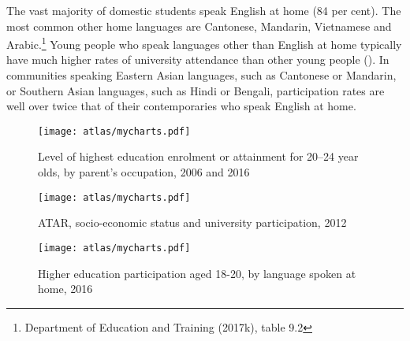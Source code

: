 \documentclass{grattan}
\begin{document}
The vast majority of domestic students speak English at home (84 per cent). The most common other home languages are Cantonese, Mandarin, Vietnamese and Arabic.\footnote{Department of Education and Training (2017k), table 9.2} Young people who speak languages other than English at home typically have much higher rates of university attendance than other young people (). In communities speaking Eastern Asian languages, such as Cantonese or Mandarin, or Southern Asian languages, such as Hindi or Bengali, participation rates are well over twice that of their contemporaries who speak English at home.

    \begin{figure} %
    \caption{Level of highest education enrolment or attainment for 20--24 year olds, by parent's occupation, 2006 and 2016}\label{fig:level-of-highest-education-enrolment-or-attainment-for-2024-year-olds-by-parents-occupation-2006-and-2016}
    \units{}
    \texttt{[image: atlas/mycharts.pdf]}
    \end{figure}


    \begin{figure} %
    \caption{ATAR, socio-economic status and university participation, 2012}\label{fig:atar-socioeconomic-status-and-university-participation-2012}
    \units{}
    \texttt{[image: atlas/mycharts.pdf]}
    \end{figure}



    \begin{figure} %
    \caption{Higher education participation aged 18-20, by language spoken at home, 2016}\label{fig:higher-education-participation-aged-1820-by-language-spoken-at-home-2016}
    \texttt{[image: atlas/mycharts.pdf]}
    \end{figure}
\end{document}
